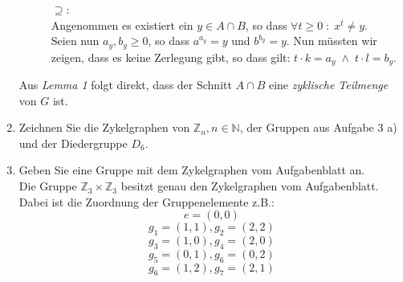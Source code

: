 \documentclass[11pt,a4paper,ngerman]{article}
\newcommand{\N}{\mathbb{N}}
\newcommand{\Z}{\mathbb{Z}}
\begin{document}
\begin{enumerate}[\bfseries a)]
\begin{description}
$\supseteq$:\\
Angenommen es existiert ein $y \in A \cap B$, so dass $\forall t \geq 0 \; : \; x^t \not= y$.\\
Seien nun $a_y , b_y \geq 0$, so dass $a^{a_y} = y$ und $b^{b_y} = y$.
Nun müssten wir zeigen, dass es keine Zerlegung gibt, so dass gilt: $t\cdot k = a_y \; \land \; t \cdot l = b_y$.

\end{description}

Aus \emph{Lemma 1} folgt direkt, dass der Schnitt $A \cap B$ eine \emph{zyklische Teilmenge} von $G$ ist.

\pagebreak

\item Zeichnen Sie die Zykelgraphen von $\Z_n, n\in \N$, der Gruppen aus Aufgabe 3 a) und der Diedergruppe $D_6$. \\
\pagebreak
\item Geben Sie eine Gruppe mit dem Zykelgraphen vom Aufgabenblatt an. \\
Die Gruppe $\Z_3 \times \Z_3$ besitzt genau den Zykelgraphen vom Aufgabenblatt. \\
Dabei ist die Zuordnung der Gruppenelemente z.B.:\\
$$ e = (0,0) $$
$$ g_1 = (1,1), g_2 = (2,2) $$
$$ g_3 = (1,0), g_4 = (2,0) $$
$$ g_5 = (0,1), g_6 = (0,2) $$
$$ g_6 = (1,2), g_7 = (2,1) $$ %
\end{enumerate}

\label{LastPage}
\end{document}
